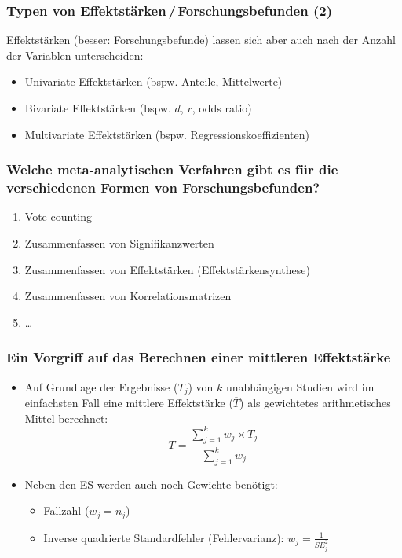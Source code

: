 \begin{frame}
  \frametitle{Typen von Effektstärken\,/\,Forschungsbefunden (2)}
  Effektstärken (besser: Forschungsbefunde) lassen sich aber auch nach der Anzahl der Variablen unterscheiden:
    \begin{itemize}
    \item Univariate Effektstärken (bspw. Anteile, Mittelwerte)
    \item Bivariate Effektstärken (bspw. $d$, $r$, odds ratio)
    \item Multivariate Effektstärken (bspw. Regressionskoeffizienten)
    \end{itemize}
  \end{frame}



\begin{frame}
  \frametitle{Welche meta-analytischen Verfahren gibt es für die verschiedenen Formen von Forschungsbefunden?}
  \begin{enumerate}
  \item Vote counting
  \item Zusammenfassen von Signifikanzwerten
  \item Zusammenfassen von Effektstärken (Effektstärkensynthese)
  \item Zusammenfassen von Korrelationsmatrizen
  \item \ldots
  \end{enumerate}
\end{frame}


\begin{frame}
  \frametitle{Ein Vorgriff auf das Berechnen einer mittleren Effektstärke}
  \begin{itemize}[<+->]
  \item Auf Grundlage der Ergebnisse ($T_j$) von $k$ unabhängigen Studien wird
    im einfachsten Fall eine mittlere Effektstärke ($\overline{T}$) als
    gewichtetes arithmetisches Mittel berechnet:
    \begin{equation*}
      \overline{T} = \frac{\sum\limits^k_{j=1}{w_j \times T_j}}{\sum\limits^k_{j=1}{w_j}}
    \end{equation*}

  \item Neben den ES werden auch noch \alert<+->{Gewichte} benötigt:
    \begin{itemize}
    \item Fallzahl ($w_j = n_j$)
    \item Inverse quadrierte Standardfehler (Fehlervarianz): $w_j = \frac{1}{SE_j^2}$
    \end{itemize}
  \end{itemize}
\end{frame}


